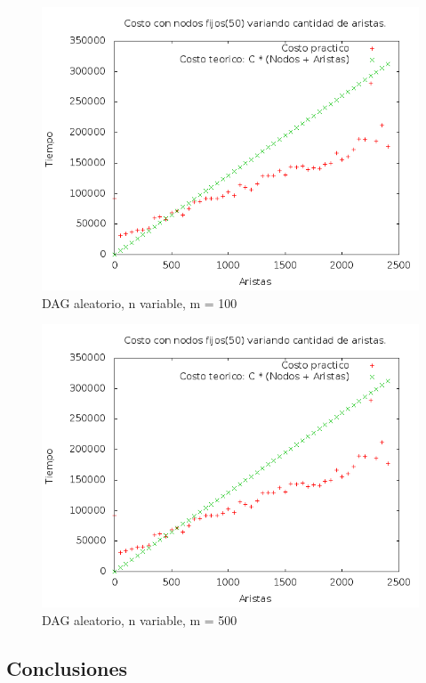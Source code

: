 \begin{figure}[H]
	\centering
	\includegraphics[scale=0.5]{blank.png}
	\caption{DAG aleatorio,  n variable, m = 100}
\end{figure}

\begin{figure}[H]
	\centering
	\includegraphics[scale=0.5]{blank.png}
	\caption{DAG aleatorio, n variable, m = 500}
\end{figure}



\subsection{Conclusiones}


